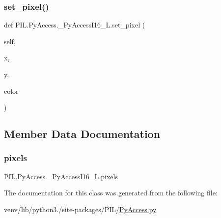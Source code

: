 \subsubsection{\texorpdfstring{set\+\_\+pixel()}{set\_pixel()}}
{\footnotesize\ttfamily def P\+I\+L.\+Py\+Access.\+\_\+\+Py\+Access\+I16\+\_\+\+L.\+set\+\_\+pixel (\begin{DoxyParamCaption}\item[{}]{self,  }\item[{}]{x,  }\item[{}]{y,  }\item[{}]{color }\end{DoxyParamCaption})}



\subsection{Member Data Documentation}
\mbox{\label{classPIL_1_1PyAccess_1_1__PyAccessI16__L_ac21125338162cb0ce1b36814a4a29533}} 
\subsubsection{\texorpdfstring{pixels}{pixels}}
{\footnotesize\ttfamily P\+I\+L.\+Py\+Access.\+\_\+\+Py\+Access\+I16\+\_\+\+L.\+pixels}



The documentation for this class was generated from the following file\+:\begin{DoxyCompactItemize}
\item 
venv/lib/python3./site-\/packages/\+P\+I\+L/\hyperlink{PyAccess_8py}{Py\+Access.\+py}\end{DoxyCompactItemize}
